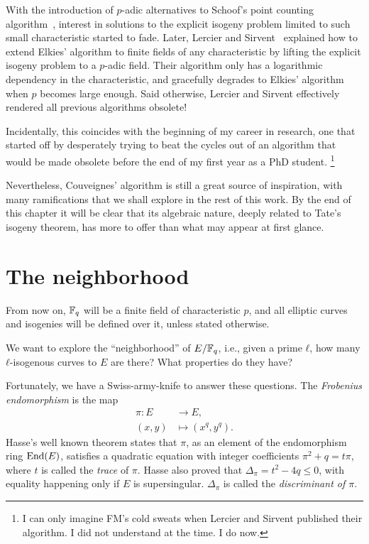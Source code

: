 \documentclass[b5layout]{hdr}
\begin{document}
With the introduction of $p$-adic alternatives to Schoof's point
counting
algorithm~\cite{satoh00,kedlaya01,kedlaya04,lauder04,10.2307/24522768},
interest in solutions to the explicit isogeny problem limited to such
small characteristic started to fade. %
Later, Lercier and Sirvent~\cite{lercier+sirvent08} explained how to
extend Elkies' algorithm to finite fields of any characteristic by
lifting the explicit isogeny problem to a $p$-adic field. %
Their algorithm only has a logarithmic dependency in the
characteristic, and gracefully degrades to Elkies' algorithm when $p$
becomes large enough. %
Said otherwise, Lercier and Sirvent effectively rendered all previous
algorithms obsolete! %

Incidentally, this coincides with the beginning of my career in
research, one that started off by desperately trying to beat the
cycles out of an algorithm that would be made obsolete before the end of
my first year as a PhD student.%
\footnote{I can only imagine FM's cold sweats
  when Lercier and Sirvent published their algorithm. I did not
  understand at the time. I do now.}

Nevertheless, Couveignes' algorithm is still a great source of
inspiration, with many ramifications that we shall explore in the rest
of this work. %
By the end of this chapter it will be clear that its algebraic nature,
deeply related to Tate's isogeny theorem, has more to offer than what
may appear at first glance. %


\section{The neighborhood}

From now on, $\mathbb{F}_q$ will be a finite field of characteristic $p$, and
all elliptic curves and isogenies will be defined over it, unless
stated otherwise. %

We want to explore the ``neighborhood'' of $E/\mathbb{F}_q$, i.e., given a
prime $ℓ$, how many $ℓ$-isogenous curves to $E$ are there? What
properties do they have?

Fortunately, we have a Swiss-army-knife to answer these questions. %
The \emph{Frobenius endomorphism} is the map
\begin{equation*}
  \begin{aligned}
    π : E &→ E,\\
    (x,y) &↦ (x^q,y^q).
  \end{aligned}
\end{equation*}
Hasse's well known theorem states that $π$, as an element of the
endomorphism ring $\operatorname{End}(E)$, satisfies a quadratic equation with
integer coefficients $π^2 + q = tπ$, where $t$ is called the
\emph{trace} of $π$. %
Hasse also proved that $Δ_π=t^2-4q≤0$, with equality happening only if
$E$ is supersingular. %
$Δ_π$ is called the \emph{discriminant of $π$}. %
\end{document}
